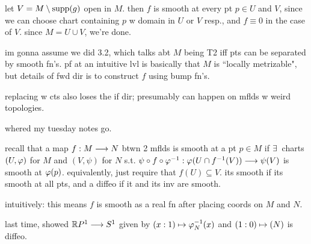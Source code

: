 \begin{pf}[source=Primary Source Material]
    let $V=M\setminus\operatorname{supp}(g)$ open in $M$.
	then $f$ is smooth at every pt $p\in U$ and $V$, since we can choose
	chart containing $p$ w domain in $U$ or $V$ resp., and $f\equiv0$ in the case of $V$.
	since $M=U\cup V$, we're done.
\end{pf}

im gonna assume we did 3.2, which talks abt $M$ being T2 iff pts can be separated by smooth fn's.
pf at an intuitive lvl is basically that $M$ is ``locally metrizable", but
details of fwd dir is to construct $f$ using bump fn's.

replacing w cts also loses the if dir;
presumably can happen on mflds w weird topologies.

whered my tuesday notes go.

recall that a map $f:M\longrightarrow N$ btwn 2 mflds is smooth at a pt $p\in M$
if $\ex$ charts $(U,\varphi)$ for $M$ and $(V,\psi)$ for $N$ s.t.
$\psi\circ f\circ\varphi^{-1}:\varphi(U\cap f^{-1}(V))\longrightarrow\psi(V)$ is smooth at $\varphi(p)$.
equivalently, just require that $f(U)\subseteq V$.
its smooth if its smooth at all pts, and a diffeo if it and its inv are smooth.

intuitively: this means $f$ is smooth as a real fn after placing coords on $M$ and $N$.

last time, showed $\mathbb{R} P^{1}\longrightarrow S^{1}$ given by $(x:1)\mapsto\varphi_{N}^{-1}(x)$
and $(1:0)\mapsto(N)$ is diffeo.

